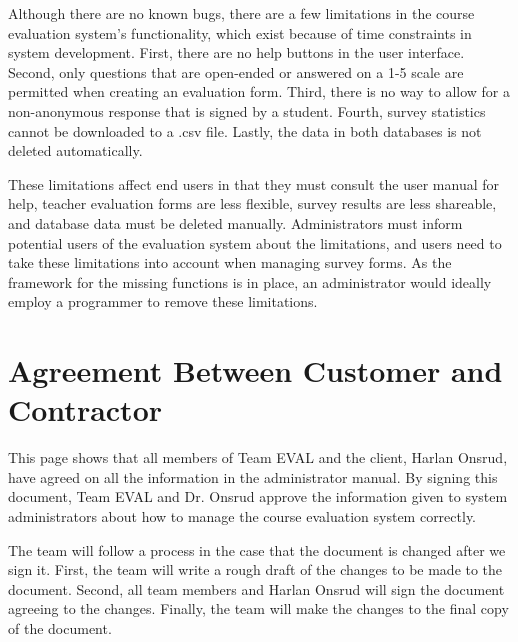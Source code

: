 \documentclass{article}
\begin{document}
Although there are no known bugs, there are a few limitations in the course evaluation system's functionality, which exist because of time constraints in system development. First, there are no help buttons in the user interface. Second, only questions that are open-ended or answered on a 1-5 scale are permitted when creating an evaluation form. Third, there is no way to allow for a non-anonymous response that is signed by a student. Fourth, survey statistics cannot be downloaded to a .csv file. Lastly, the data in both databases is not deleted automatically.

These limitations affect end users in that they must consult the user manual for help, teacher evaluation forms are less flexible, survey results are less shareable, and database data must be deleted manually. Administrators must inform potential users of the evaluation system about the limitations, and users need to take these limitations into account when managing survey forms. As the framework for the missing functions is in place, an administrator would ideally employ a programmer to remove these limitations.

\appendix

\newpage
\section{Agreement Between Customer and Contractor}

This page shows that all members of Team EVAL and the client, Harlan Onsrud, have agreed on all the information in the administrator manual. By signing this document, Team EVAL and Dr. Onsrud approve the information given to system administrators about how to manage the course evaluation system correctly.

The team will follow a process in the case that the document is changed after we sign it. First, the team will write a rough draft of the changes to be made to the document. Second, all team members and Harlan Onsrud will sign the document agreeing to the changes. Finally, the team will make the changes to the final copy of the document.
\end{document}
